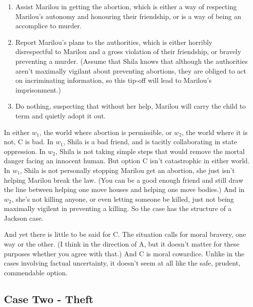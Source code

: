 \begin{enumerate}
\item{} Assist \gls{Marilou} in getting the abortion, which is either a way of respecting \gls{Marilou}'s autonomy and honouring their friendship, or is a way of being an accomplice to murder.

\item{} Report \gls{Marilou}'s plans to the authorities, which is either horribly disrespectful to \gls{Marilou} and a gross violation of their friendship, or bravely preventing a murder. (Assume that Shila knows that although the authorities aren't maximally vigilant about preventing abortions, they are obliged to act on incriminating information, so this tip-off will lead to Marilou's imprisonment.)

\item{} Do nothing, suspecting that without her help, \gls{Marilou} will carry the child to term and quietly adopt it out.

\end{enumerate}
\renewcommand{\labelenumi}{\arabic{enumi}.} In either $w_1$, the world where abortion is permissible, or $w_2$, the world where it is not, C is bad. In $w_1$, \gls{Shila} is a bad friend, and is tacitly collaborating in state oppression. In $w_2$, \gls{Shila} is not taking simple steps that would remove the mortal danger facing an innocent human. But option C isn't catastrophic in either world. In $w_1$, \gls{Shila} is not personally stopping \gls{Marilou} get an abortion, she just isn't helping \gls{Marilou} break the law. (You can be a good enough friend and still draw the line between helping one move houses and helping one move bodies.) And in $w_2$, she's not killing anyone, or even letting someone be killed, just not being maximally vigilent in preventing a killing. So the case has the structure of a Jackson case.

And yet there is little to be said for C. The situation calls for moral bravery, one way or the other. (I think in the direction of A, but it doesn't matter for these purposes whether you agree with that.) And C is moral cowardice. Unlike in the cases involving factual uncertainty, it doesn't seem at all like the safe, prudent, commendable option.

\subsection{Case Two - Theft}
\label{casetwo-theft}

